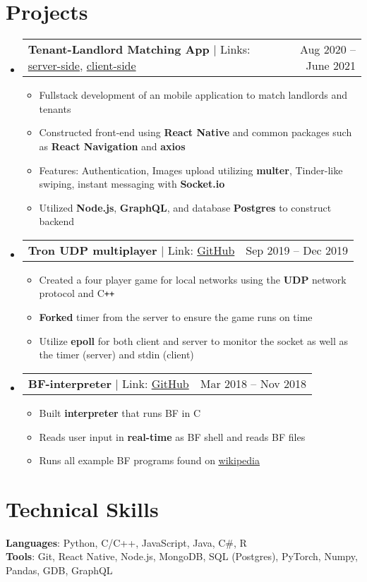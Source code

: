 \documentclass[letterpaper,11pt]{article}
\makeatletter
\newcommand{\resumeItem}[1]{
  \item\small{
    {#1 \vspace{-2pt}}
  }
}
\newcommand{\resumeProjectHeading}[2]{
    \item
    \begin{tabular*}{0.97\textwidth}{l@{\extracolsep{\fill}}r}
      \small#1 & #2 \\
    \end{tabular*}\vspace{-7pt}
}
\newcommand{\resumeSubHeadingListStart}{\begin{itemize}[leftmargin=0.15in, label={}]}
\newcommand{\resumeSubHeadingListEnd}{\end{itemize}}
\newcommand{\resumeItemListStart}{\begin{itemize}}
\newcommand{\resumeItemListEnd}{\end{itemize}\vspace{-5pt}}
\makeatother
\begin{document}
\section{Projects}
    \resumeSubHeadingListStart
                \resumeProjectHeading
          {\textbf{Tenant-Landlord Matching App} $|$ Links: \href{https://github.com/JaLnYn/pk2_ser}{server-side}, \href{https://github.com/JaLnYn/pk2_cli}{client-side}}{Aug 2020 -- June 2021}
          \resumeItemListStart
            \resumeItem{Fullstack development of an mobile application to match landlords and tenants}
            \resumeItem{Constructed front-end using \textbf{React Native} and common packages such as \textbf{React Navigation} and \textbf{axios}}
            \resumeItem{Features: Authentication, Images upload utilizing \textbf{multer}, Tinder-like swiping, instant messaging with \textbf{Socket.io}}
            \resumeItem{Utilized \textbf{Node.js}, \textbf{GraphQL}, and database \textbf{Postgres} to construct backend}
          \resumeItemListEnd
      \resumeProjectHeading
        {\textbf{Tron UDP multiplayer} $|$ Link: \href{https://github.com/JaLnYn/Tron}{GitHub}}{Sep 2019 -- Dec 2019}
        \resumeItemListStart
          \resumeItem{Created a four player game for local networks using the \textbf{UDP} network protocol and C\texttt{++}}
          \resumeItem{\textbf{Forked} timer from the server to ensure the game runs on time}
          \resumeItem{Utilize \textbf{epoll} for both client and server to monitor the socket as well as the timer (server) and stdin (client)}
        \resumeItemListEnd
      \resumeProjectHeading
        {\textbf{BF-interpreter} $|$ Link: \href{https://github.com/JaLnYn/Bf-interpreter}{GitHub}}{Mar 2018 -- Nov 2018}
        \resumeItemListStart
          \resumeItem{Built \textbf{interpreter} that runs BF in C}
          \resumeItem{Reads user input in \textbf{real-time} as BF shell and reads BF files}
          \resumeItem{Runs all example BF programs found on \href{https://en.wikipedia.org/wiki/Esoteric_programming_language\#Binary_lambda_calculus}{\underline{wikipedia}}}
        \resumeItemListEnd
    \resumeSubHeadingListEnd



%
\section{Technical Skills}
 \begin{itemize}[leftmargin=0.15in, label={}]
    \small{\item{
     \textbf{Languages}{: Python, C/C++, JavaScript, Java, C\#, R} \\
     \textbf{Tools}{: Git, React Native, Node.js, MongoDB, SQL (Postgres), PyTorch, Numpy, Pandas, GDB, GraphQL} \\
    }}
 \end{itemize}


\end{document}
